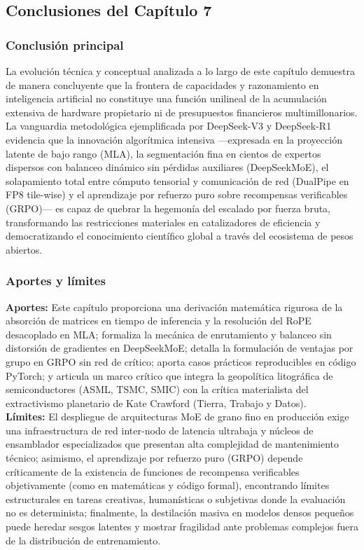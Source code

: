 \newpage
\subsection*{Conclusiones del Capítulo 7}

\subsubsection*{Conclusión principal}
La evolución técnica y conceptual analizada a lo largo de este capítulo demuestra de manera concluyente que la frontera de capacidades y razonamiento en inteligencia artificial no constituye una función unilineal de la acumulación extensiva de hardware propietario ni de presupuestos financieros multimillonarios. La vanguardia metodológica ejemplificada por DeepSeek-V3 y DeepSeek-R1 evidencia que la innovación algorítmica intensiva ---expresada en la proyección latente de bajo rango (MLA), la segmentación fina en cientos de expertos dispersos con balanceo dinámico sin pérdidas auxiliares (DeepSeekMoE), el solapamiento total entre cómputo tensorial y comunicación de red (DualPipe en FP8 tile-wise) y el aprendizaje por refuerzo puro sobre recompensas verificables (GRPO)--- es capaz de quebrar la hegemonía del escalado por fuerza bruta, transformando las restricciones materiales en catalizadores de eficiencia y democratizando el conocimiento científico global a través del ecosistema de pesos abiertos.

\subsubsection*{Aportes y límites}
\textbf{Aportes:} Este capítulo proporciona una derivación matemática rigurosa de la absorción de matrices en tiempo de inferencia y la resolución del RoPE desacoplado en MLA; formaliza la mecánica de enrutamiento y balanceo sin distorsión de gradientes en DeepSeekMoE; detalla la formulación de ventajas por grupo en GRPO sin red de crítico; aporta casos prácticos reproducibles en código PyTorch; y articula un marco crítico que integra la geopolítica litográfica de semiconductores (ASML, TSMC, SMIC) con la crítica materialista del extractivismo planetario de Kate Crawford (Tierra, Trabajo y Datos).\\[0.15cm]
\textbf{Límites:} El despliegue de arquitecturas MoE de grano fino en producción exige una infraestructura de red inter-nodo de latencia ultrabaja y núcleos de ensamblador especializados que presentan alta complejidad de mantenimiento técnico; asimismo, el aprendizaje por refuerzo puro (GRPO) depende críticamente de la existencia de funciones de recompensa verificables objetivamente (como en matemáticas y código formal), encontrando límites estructurales en tareas creativas, humanísticas o subjetivas donde la evaluación no es determinista; finalmente, la destilación masiva en modelos densos pequeños puede heredar sesgos latentes y mostrar fragilidad ante problemas complejos fuera de la distribución de entrenamiento.


